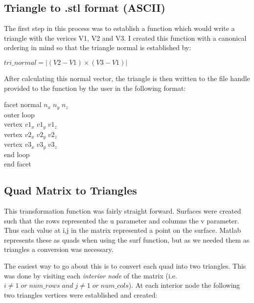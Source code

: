 \documentclass[twocolumn]{article}
\begin{document}
\subsection{Triangle to .stl format (ASCII)}

The first step in this process was to establish a function which would write a triangle with the verices V1, V2 and V3. I created this function with a canonical ordering in mind so that the triangle normal is established by:

\begin{center}
$ tri\_normal = |(V2-V1) \times (V3-V1)|$
\end{center} 

After calculating this normal vector, the triangle is then written to the file handle provided to the function by the user in the following format: 


\begin{flushleft}


{facet normal $n_x \; n_y \; n_z$\\
\hspace{5mm}	outer loop\\
\hspace{10mm}		vertex $v1_x \; v1_y \; v1_z$\\
\hspace{10mm}		vertex $v2_x \; v2_y \; v2_z$\\
\hspace{10mm}		vertex $v3_x \; v3_y \; v3_z$\\
\hspace{5mm} end loop\\
end facet\\}
\end{flushleft}


\subsection{Quad Matrix to Triangles}

This transformation function was fairly straight forward. Surfaces were created such that the rows represented the u parameter and columns the v parameter. Thus each value at i,j in the matrix represented a point on the surface. Matlab represents these as quads when using the surf function, but as we needed them as triangles a conversion was necessary. 

The easiest way to go about this is to convert each quad into two triangles. This was done by visiting each \textit{interior node} of the matrix (i.e. $ i \neq  1 \; or \; num\_rows \; and \; j \neq 1 \; or \; num\_cols $). At each interior node the following two triangles vertices were established and created:
\end{document}
